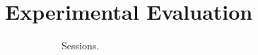 
\section{Experimental Evaluation}\label{sec:exp}

\begin{figure}
\centering
 \begin{subfigure}{.33\textwidth}
  \caption{Sessions.}
  \label{ser_node_scale}
 \end{subfigure}
 \begin{subfigure}{.33\textwidth}
\end{subfigure}
\end{figure}
